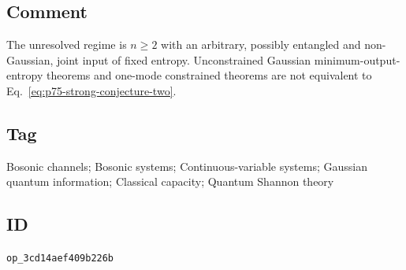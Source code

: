 \subsection*{Comment}

The unresolved regime is $n\geq2$ with an arbitrary, possibly entangled and
non-Gaussian, joint input of fixed entropy.  Unconstrained Gaussian
minimum-output-entropy theorems and one-mode constrained theorems are not
equivalent to Eq.~\eqref{eq:p75-strong-conjecture-two}.

\subsection*{Tag}

Bosonic channels; Bosonic systems; Continuous-variable systems; Gaussian
quantum information; Classical capacity; Quantum Shannon theory

\subsection*{ID}

\texttt{op\_3cd14aef409b226b}
